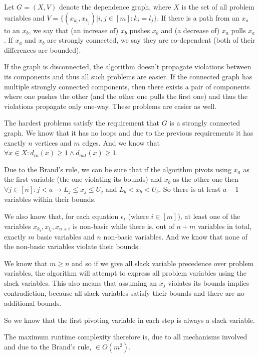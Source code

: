 \documentclass[a4paper,12pt]{article} %
\begin{document}
Let $G = (X, V)$ denote the dependence graph, where $X$ is the set of all problem variables and $V = \{(x_{k_i}, x_{k_j}) | i, j \in [m] : k_i = l_j\}$. If there is a path from an $x_a$ to an $x_b$, we say that (an increase of) $x_b$ pushes $x_b$ and (a decrease of) $x_a$ pulls $x_a$. If $x_a$ and $x_b$ are strongly connected, we say they are co-dependent (both of their differences are bounded).

If the graph is disconnected, the algorithm doesn't propagate violations between its components and thus all such problems are easier. If the connected graph has multiple strongly connected components, then there exists a pair of components where one pushes the other (and the other one pulls the first one) and thus the violations propagate only one-way. These problems are easier as well.

The hardest problems satisfy the requirement that $G$ is a strongly connected graph. We know that it has no loops and due to the previous requirements it has exactly $n$ vertices and $m$ edges. And we know that $\forall x \in X : d_{in}(x) \geq 1 \wedge d_{out}(x) \geq 1$.

Due to the Brand's rule, we can be sure that if the algorithm pivots using $x_a$ as the first variable (the one violating its bounds) and $x_b$ as the other one then $\forall j \in [n]: j < a \to L_j  \leq x_j \leq U_j$ and $L_b < x_b < U_b$. So there is at least $a - 1$ variables within their bounds.

We also know that, for each equation $\epsilon_i$ (where $i \in [m]$), at least one of the variables $x_{k_i}, x_{l_i}, x_{n+i}$ is non-basic while there is, out of $n + m$ variables in total, exactly $m$ basic variables and $n$ non-basic variables. And we know that none of the non-basic variables violate their bounds.

We know that $m \geq n$ and so if we give all slack variable precedence over problem variables, the algorithm will attempt to express all problem variables using the slack variables. This also means that assuming an $x_j$ violates its bounds implies contradiction, because all slack variables satisfy their bounds and there are no additional bounds.

So we know that the first pivoting variable in each step is always a slack variable.

The maximum runtime complexity therefore is, due to all mechanisms involved and due to the Brand's rule, $\in O(m^2)$.
\end{document}
